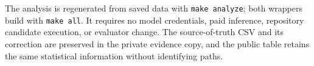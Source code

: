 The analysis is regenerated from saved data with \texttt{make analyze}; both wrappers build with \texttt{make all}. It requires no model credentials, paid inference, repository candidate execution, or evaluator change. The source-of-truth CSV and its correction are preserved in the private evidence copy, and the public table retains the same statistical information without identifying paths.
